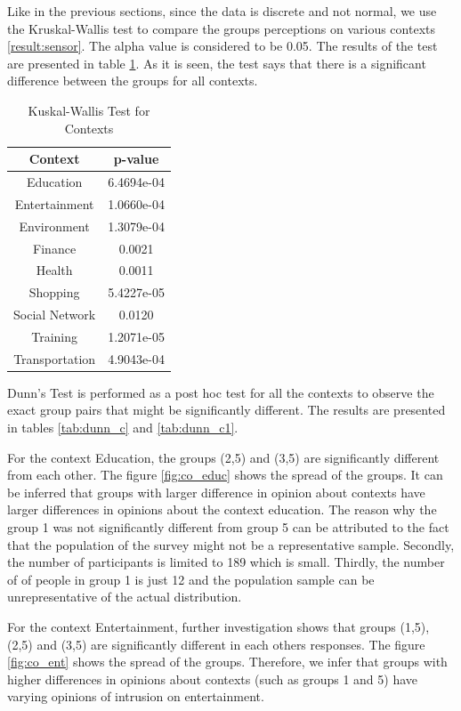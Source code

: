 Like in the previous sections, since the data is discrete and not normal, we use the Kruskal-Wallis test to compare the groups perceptions on various contexts \ref{result:sensor}. The alpha value is considered to be 0.05. The results of the test are presented in table \ref{tab:kw_c}. As it is seen, the test says that there is a significant difference between the groups for all contexts.

\begin{table}[h!]
  \centering
  \caption{Kuskal-Wallis Test for Contexts}
  \label{tab:kw_c}
  \begin{tabular}{cc}
    \toprule
     Context & p-value \\
    \midrule
    Education &  6.4694e-04 \\
    Entertainment & 1.0660e-04\\
    Environment & 1.3079e-04\\
    Finance & 0.0021\\ 
    Health & 0.0011\\
    Shopping & 5.4227e-05\\ 
    Social Network &  0.0120\\
    Training & 1.2071e-05\\
    Transportation & 4.9043e-04\\ 
    \bottomrule
  \end{tabular}
\end{table} 

Dunn's Test is performed as a post hoc test for all the contexts to observe the exact group pairs that might be significantly different. The results are presented in tables \ref{tab:dunn_c} and \ref{tab:dunn_c1}. 

For the context Education, the groups (2,5) and (3,5) are significantly different from each other. The figure \ref{fig:co_educ} shows the spread of the groups. It can be inferred that groups with larger difference in opinion about contexts have larger differences in opinions about the context education. The reason why the group 1 was not significantly different from group 5 can be attributed to the fact that the population of the survey might not be a representative sample. Secondly, the number of participants is limited to 189 which is small. Thirdly, the number of of people in group 1 is just 12 and the population sample can be unrepresentative of the actual distribution.

For the context Entertainment, further investigation shows that groups (1,5), (2,5) and (3,5) are significantly different in each others responses. The figure \ref{fig:co_ent} shows the spread of the groups. Therefore, we infer that groups with higher differences in opinions about contexts (such as groups 1 and 5) have varying opinions of intrusion on entertainment.

